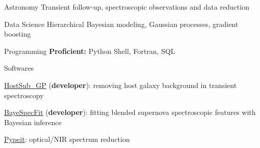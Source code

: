 


\begin{cvskills}


\cvskill
{Astronomy} %
{Transient follow-up, spectroscopic observations and data reduction} %


\cvskill
{Data Science} %
{Hierarchical Bayesian modeling, Gaussian processes, gradient boosting} %


\cvskill
{Programming} %
{{\bf\color{darktext}Proficient:} Python Shell, Fortran, SQL} %



\cvskill
{Softwares} %
{\begin{cvitems}
    \item {\href{https://github.com/slowdivePTG/HostSub_GP}{HostSub\_GP} ({\bf\color{darktext}developer}): removing host galaxy background in transient spectroscopy}
    \item {\href{https://github.com/slowdivePTG/BayeSpecFit}{BayeSpecFit} ({\bf\color{darktext}developer}): fitting blended supernova spectroscopic features with Bayesian inference}
    \item \href{https://pypeit.readthedocs.io/en/release/}{Pypeit}: optical/NIR spectrum reduction
\end{cvitems}}%

\end{cvskills}